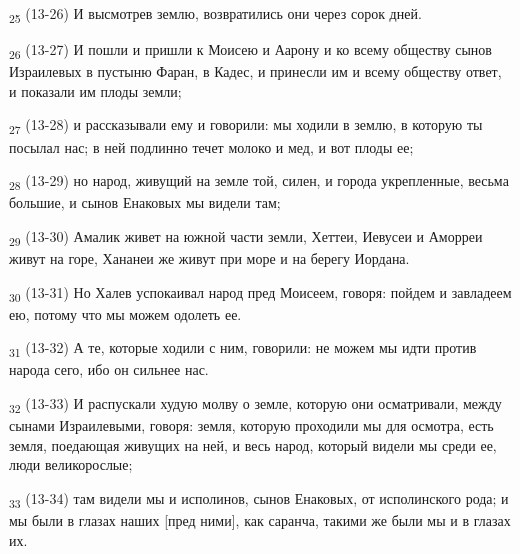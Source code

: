 \begin{tcolorbox}
\textsubscript{25} (13-26) И высмотрев землю, возвратились они через сорок дней.
\end{tcolorbox}
\begin{tcolorbox}
\textsubscript{26} (13-27) И пошли и пришли к Моисею и Аарону и ко всему обществу сынов Израилевых в пустыню Фаран, в Кадес, и принесли им и всему обществу ответ, и показали им плоды земли;
\end{tcolorbox}
\begin{tcolorbox}
\textsubscript{27} (13-28) и рассказывали ему и говорили: мы ходили в землю, в которую ты посылал нас; в ней подлинно течет молоко и мед, и вот плоды ее;
\end{tcolorbox}
\begin{tcolorbox}
\textsubscript{28} (13-29) но народ, живущий на земле той, силен, и города укрепленные, весьма большие, и сынов Енаковых мы видели там;
\end{tcolorbox}
\begin{tcolorbox}
\textsubscript{29} (13-30) Амалик живет на южной части земли, Хеттеи, Иевусеи и Аморреи живут на горе, Хананеи же живут при море и на берегу Иордана.
\end{tcolorbox}
\begin{tcolorbox}
\textsubscript{30} (13-31) Но Халев успокаивал народ пред Моисеем, говоря: пойдем и завладеем ею, потому что мы можем одолеть ее.
\end{tcolorbox}
\begin{tcolorbox}
\textsubscript{31} (13-32) А те, которые ходили с ним, говорили: не можем мы идти против народа сего, ибо он сильнее нас.
\end{tcolorbox}
\begin{tcolorbox}
\textsubscript{32} (13-33) И распускали худую молву о земле, которую они осматривали, между сынами Израилевыми, говоря: земля, которую проходили мы для осмотра, есть земля, поедающая живущих на ней, и весь народ, который видели мы среди ее, люди великорослые;
\end{tcolorbox}
\begin{tcolorbox}
\textsubscript{33} (13-34) там видели мы и исполинов, сынов Енаковых, от исполинского рода; и мы были в глазах наших [пред ними], как саранча, такими же были мы и в глазах их.
\end{tcolorbox}
